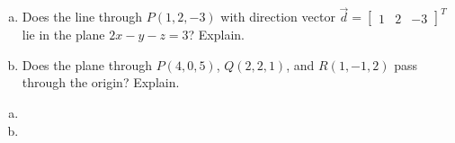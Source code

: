 \documentclass[../main.tex]{subfiles}
\begin{document}
\begin{enumerate}[a)]
	\item Does the line through $P(1, 2, -3)$ with direction vector $\vec{d} = \begin{bmatrix}1&2&-3\end{bmatrix}^T$ lie in the plane $2x - y - z = 3$? Explain.
	\item Does the plane through $P(4, 0, 5)$, $Q(2, 2, 1)$, and $R(1, -1, 2)$ pass through the origin? Explain.
\end{enumerate}

\solution
\begin{enumerate}[a)]
	\item 
	\item 
\end{enumerate}
\end{document}
